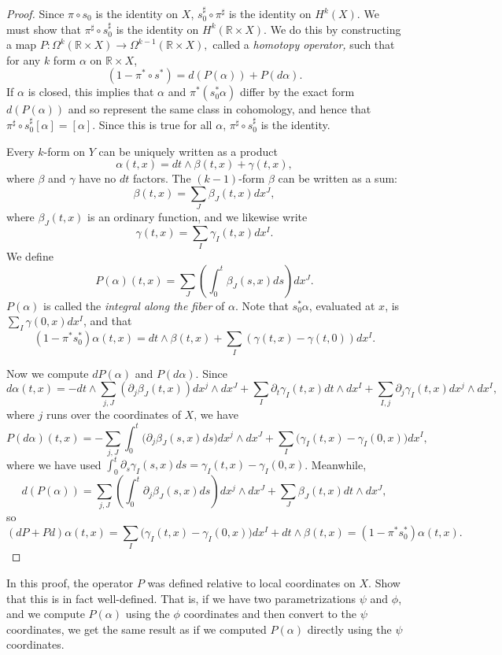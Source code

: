 \documentclass[12pt]{amsbook}
\newcommand{\R}{{\mathbb R}}
\theoremstyle{definition}
\begin{document}
\begin{proof}
Since $\pi \circ s_0$ is the identity on $X$, $s_0^\sharp \circ \pi^\sharp$ is the
identity on $H^k(X)$. We must show that $\pi^\sharp \circ s_0^\sharp$ is the 
identity on $H^k(\R \times X)$. We do this by constructing 
a map 
$P: \Omega^k(\R \times X) \to \Omega^{k-1}(\R \times X),$ 
called a {\em homotopy operator,} such that for any $k$ form
$\alpha$ on $\R \times X$, 
$$ (1 - \pi^*\circ s^*) = d (P(\alpha)) + P(d\alpha).$$
If $\alpha$ is closed, this implies 
that $\alpha$ and $\pi^*(s_0^*\alpha)$ differ by the exact form $d(P(\alpha))$
and so represent the same class in cohomology,
and hence that $\pi^\sharp \circ s_0^\sharp[\alpha]=[\alpha]$. Since this is 
true for all $\alpha$, $\pi^\sharp \circ s_0^\sharp$ is the identity. 

Every $k$-form on $Y$ can be uniquely written as a product
$$\alpha(t,x) = dt \wedge \beta(t,x) + \gamma(t,x),$$
where $\beta$ and $\gamma$ have no $dt$ factors. The $(k-1)$-form $\beta$ 
can be written as a sum:
$$\beta(t,x) = \sum_J \beta_J(t,x) dx^J,$$
where $\beta_J(t,x)$ is an ordinary function, and 
we likewise write
$$\gamma(t,x) = \sum_I \gamma_I(t,x) dx^I.$$ 
We define
$$P(\alpha)(t,x) = \sum_J (\int_0^t \beta_J(s,x) ds) dx^J.$$
$P(\alpha)$ is called the {\em integral along the fiber} of $\alpha$. 
Note that $s_0^*\alpha$, evaluated at $x$, is $\sum_I \gamma(0,x) dx^I$,
and that 
$$(1-\pi^*s_0^*)\alpha (t,x) = dt \wedge \beta(t,x) + 
\sum_I(\gamma(t,x)-\gamma(t,0)) dx^I.$$ 

Now
we compute $dP(\alpha)$ and $P(d\alpha)$. 
Since
$$ d\alpha(t,x) = -dt \wedge \sum_{j,J} (\partial_j \beta_J(t,x))dx^j\wedge dx^J
+ \sum_{I} \partial_t\gamma_I(t,x) dt\wedge dx^I + \sum_{I,j}
\partial_j \gamma_I(t,x) dx^j \wedge dx^I,$$
where $j$ runs over the coordinates of $X$, we have 
$$P(d\alpha)(t,x) = -\sum_{j,J} \int_0^t \Big (\partial_j \beta_J(s,x)ds \Big )dx^j\wedge
dx^J + \sum_I \Big (\gamma_I(t,x)-\gamma_I(0,x) \Big ) dx^I,$$ 
where we have used $\int_0^t \partial_s \gamma_I(s,x) ds = \gamma_I(t,x)-\gamma_I(0,x)$. 
Meanwhile,
$$d(P(\alpha)) = \sum_{j,J} \left (\int_0^t \partial_j \beta_J(s,x) ds \right ) dx^j
\wedge dx^J + \sum_J \beta_J(t,x) dt \wedge dx^J,$$
so 
$$ (dP+Pd)\alpha(t,x) = \sum_I \Big (\gamma_I(t,x)-\gamma_I(0,x) \Big ) dx^I + 
dt \wedge \beta(t,x) = (1-\pi^*s_0^*) \alpha(t,x).$$
\end{proof}

 In this proof, the operator 
$P$ was defined relative to local coordinates on $X$. Show that this 
is in fact well-defined. That is, if we have two parametrizations
$\psi$ and $\phi$, and we compute $P(\alpha)$ using the $\phi$ coordinates
and then convert to the $\psi$ coordinates, we get the same result as if 
we computed $P(\alpha)$ directly using the $\psi$ coordinates.
\end{document}

